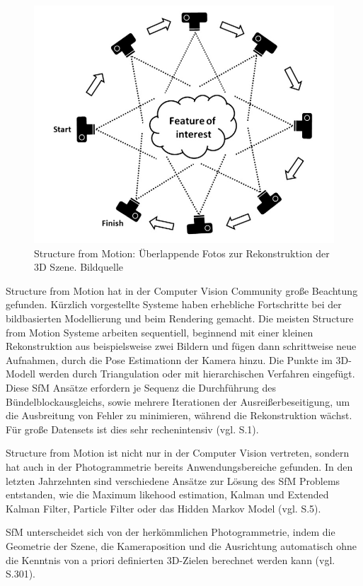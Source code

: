 \begin{figure}[H]
	\centering
	\includegraphics[scale=0.6]{sfm.png}
	\caption{Structure from Motion: Überlappende Fotos zur Rekonstruktion der 3D Szene. Bildquelle \cite{sfm_photo}}
\end{figure}  

Structure from Motion hat in der Computer Vision Community große Beachtung gefunden. Kürzlich vorgestellte Systeme haben erhebliche Fortschritte bei der bildbasierten Modellierung und beim Rendering gemacht. Die meisten Structure from Motion Systeme arbeiten sequentiell, beginnend mit einer kleinen Rekonstruktion aus beispielsweise zwei Bildern und fügen dann schrittweise neue Aufnahmen, durch die Pose Estimationn der Kamera hinzu. Die Punkte im 3D-Modell werden durch Triangulation oder mit hierarchischen Verfahren eingefügt. Diese SfM Ansätze erfordern je Sequenz die Durchführung des Bündelblockausgleichs, sowie mehrere Iterationen der Ausreißerbeseitigung, um die Ausbreitung von Fehler zu minimieren, während die Rekonstruktion wächst. Für große Datensets ist dies sehr rechenintensiv (vgl. \cite{sfm} S.1).

Structure from Motion ist nicht nur in der Computer Vision vertreten, sondern hat auch in der Photogrammetrie bereits Anwendungsbereiche gefunden. In den letzten Jahrzehnten sind verschiedene Ansätze zur Lösung des SfM Problems entstanden, wie die \glqq Maximum likehood estimation\grqq{}, \glqq Kalman und Extended Kalman Filter\grqq{}, \glqq Particle Filter\grqq{} oder das \glqq Hidden Markov Model\grqq{} (vgl. \cite{efficient_bundle} S.5).

SfM unterscheidet sich von der herkömmlichen Photogrammetrie, indem die Geometrie der Szene, die Kameraposition und die Ausrichtung automatisch ohne die Kenntnis von a priori definierten 3D-Zielen berechnet werden kann (vgl. \cite{sfm_photo} S.301).

